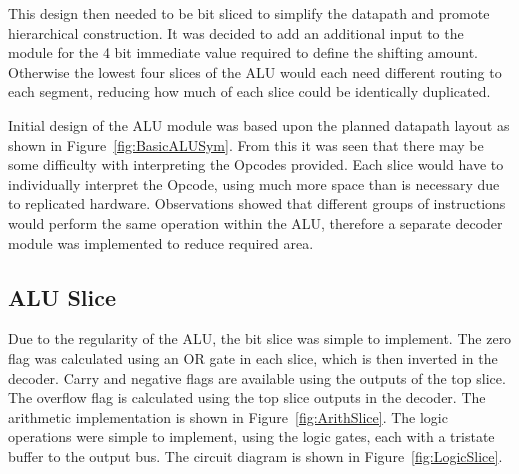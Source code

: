 This design then needed to be bit sliced to simplify the datapath and promote hierarchical construction. 
It was decided to add an additional input to the module for the 4 bit immediate value required to define the shifting amount. 
Otherwise the lowest four slices of the ALU would each need different routing to each segment, reducing how much of each slice could be identically duplicated. 

Initial design of the ALU module was based upon the planned datapath layout as shown in Figure~\ref{fig:BasicALUSym}. 
From this it was seen that there may be some difficulty with interpreting the Opcodes provided. 
Each slice would have to individually interpret the Opcode, using much more space than is necessary due to replicated hardware. 
Observations showed that different groups of instructions would perform the same operation within the ALU, therefore a separate decoder module was implemented to reduce required area.

\subsection{ALU Slice}
Due to the regularity of the ALU, the bit slice was simple to implement.
The zero flag was calculated using an OR gate in each slice, which is then inverted in the decoder.
Carry and negative flags are available using the outputs of the top slice. 
The overflow flag is calculated using the top slice outputs in the decoder.
The arithmetic implementation is shown in Figure~\ref{fig:ArithSlice}. 
The logic operations were simple to implement, using the logic gates, each with a tristate buffer to the output bus.
The circuit diagram is shown in Figure~\ref{fig:LogicSlice}.


